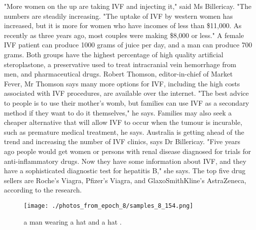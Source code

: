 \documentclass{article}%
\begin{document}
"More women on the up are taking IVF and injecting it," said Ms Billericay. "The numbers are steadily increasing.\newline%
"The uptake of IVF by western women has increased, but it is more for women who have incomes of less than \$11,000. As recently as three years ago, most couples were making \$8,000 or less."\newline%
A female IVF patient can produce 1000 grams of juice per day, and a man can produce 700 grams. Both groups have the highest percentage of high quality artificial steroplastone, a preservative used to treat intracranial vein hemorrhage from men, and pharmaceutical drugs.\newline%
Robert Thomson, editor{-}in{-}chief of Market Fever, Mr Thomson says many more options for IVF, including the high costs associated with IVF procedures, are available over the internet.\newline%
"The best advice to people is to use their mother's womb, but families can use IVF as a secondary method if they want to do it themselves," he says.\newline%
Families may also seek a cheaper alternative that will allow IVF to occur when the tumour is incurable, such as premature medical treatment, he says.\newline%
Australia is getting ahead of the trend and increasing the number of IVF clinics, says Dr Billericay.\newline%
"Five years ago people would get women or persons with renal disease diagnosed for trials for anti{-}inflammatory drugs. Now they have some information about IVF, and they have a sophisticated diagnostic test for hepatitis B," she says.\newline%
The top five drug sellers are Roche's Viagra, Pfizer's Viagra, and GlaxoSmithKline's AstraZeneca, according to the research.\newline%

%


\begin{figure}[h!]%
\centering%
\texttt{[image: ./photos\_from\_epoch\_8/samples\_8\_154.png]}%
\caption{a man wearing a hat and a hat .}%
\end{figure}

%
\end{document}
